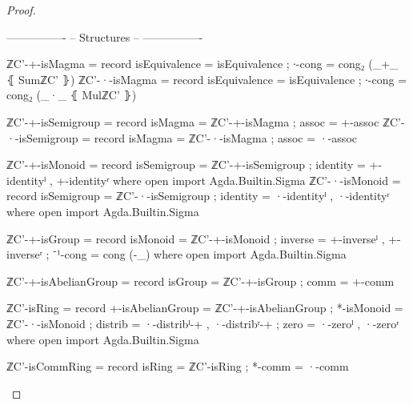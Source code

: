 \documentclass[a4paper]{report}
\theoremstyle{definition}
\begin{document}
\begin{proof}
\begin{code}
  ----------------
  -- Structures --
  ----------------

  ℤC'-+-isMagma = record
    { isEquivalence = isEquivalence
    ; ∙-cong        =  cong₂ (_+_ ⦃ SumℤC' ⦄)
    }
  ℤC'-·-isMagma = record
    { isEquivalence = isEquivalence
    ; ∙-cong        =  cong₂ (_·_ ⦃ MulℤC' ⦄)
    }

  ℤC'-+-isSemigroup = record
    { isMagma = ℤC'-+-isMagma
    ; assoc   = +-assoc
    }
  ℤC'-·-isSemigroup = record
    { isMagma = ℤC'-·-isMagma
    ; assoc   = ·-assoc
    }

  ℤC'-+-isMonoid = record
    { isSemigroup = ℤC'-+-isSemigroup
    ; identity    = +-identityˡ , +-identityʳ
    }
    where open import Agda.Builtin.Sigma
  ℤC'-·-isMonoid = record
    { isSemigroup = ℤC'-·-isSemigroup
    ; identity    = ·-identityˡ , ·-identityʳ
    }
    where open import Agda.Builtin.Sigma

  ℤC'-+-isGroup = record
    { isMonoid = ℤC'-+-isMonoid
    ; inverse  = +-inverseˡ , +-inverseʳ
    ; ⁻¹-cong  = cong (-_)
    }
    where open import Agda.Builtin.Sigma

  ℤC'-+-isAbelianGroup = record
    { isGroup = ℤC'-+-isGroup
    ; comm    = +-comm
    }

  ℤC'-isRing = record
    { +-isAbelianGroup = ℤC'-+-isAbelianGroup
    ; *-isMonoid       = ℤC'-·-isMonoid
    ; distrib          = ·-distribˡ-+ , ·-distribʳ-+
    ; zero             = ·-zeroˡ , ·-zeroʳ
    }
    where open import Agda.Builtin.Sigma

  ℤC'-isCommRing = record
    { isRing = ℤC'-isRing
    ; *-comm = ·-comm
    }
  \end{code}
\end{proof}
\end{document}
